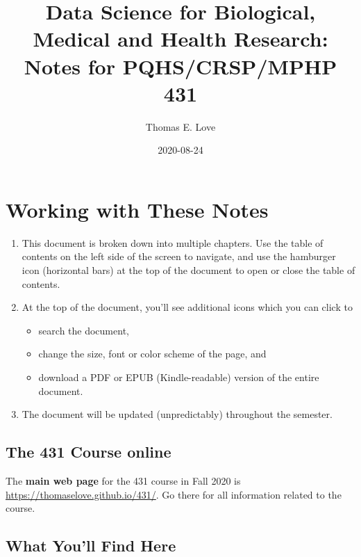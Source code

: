 \documentclass[
]{book}
\title{Data Science for Biological, Medical and Health Research: Notes for PQHS/CRSP/MPHP 431}
\author{Thomas E. Love}
\date{2020-08-24}
\providecommand{\tightlist}{%
  \setlength{\itemsep}{0pt}\setlength{\parskip}{0pt}}
\begin{document}
\maketitle

{
\setcounter{tocdepth}{1}
\tableofcontents
}
\hypertarget{working-with-these-notes}{%
\chapter*{Working with These Notes}\label{working-with-these-notes}}

\begin{enumerate}
\def\labelenumi{\arabic{enumi}.}
\tightlist
\item
  This document is broken down into multiple chapters. Use the table of contents on the left side of the screen to navigate, and use the hamburger icon (horizontal bars) at the top of the document to open or close the table of contents.
\item
  At the top of the document, you'll see additional icons which you can click to

  \begin{itemize}
  \tightlist
  \item
    search the document,
  \item
    change the size, font or color scheme of the page, and
  \item
    download a PDF or EPUB (Kindle-readable) version of the entire document.
  \end{itemize}
\item
  The document will be updated (unpredictably) throughout the semester.
\end{enumerate}

\hypertarget{the-431-course-online}{%
\section*{The 431 Course online}\label{the-431-course-online}}

The \textbf{main web page} for the 431 course in Fall 2020 is \url{https://thomaselove.github.io/431/}. Go there for all information related to the course.

\hypertarget{what-youll-find-here}{%
\section*{What You'll Find Here}\label{what-youll-find-here}}
\end{document}
